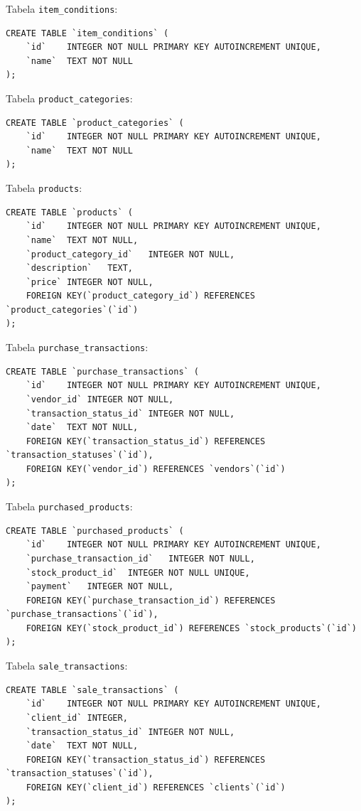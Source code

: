 Tabela \lstinline|item_conditions|:

\begin{lstlisting}[style=SQLite]
CREATE TABLE `item_conditions` (
	`id`	INTEGER NOT NULL PRIMARY KEY AUTOINCREMENT UNIQUE,
	`name`	TEXT NOT NULL
);
\end{lstlisting}

Tabela \lstinline|product_categories|:

\begin{lstlisting}[style=SQLite]
CREATE TABLE `product_categories` (
	`id`	INTEGER NOT NULL PRIMARY KEY AUTOINCREMENT UNIQUE,
	`name`	TEXT NOT NULL
);
\end{lstlisting}

Tabela \lstinline|products|:

\begin{lstlisting}[style=SQLite]
CREATE TABLE `products` (
	`id`	INTEGER NOT NULL PRIMARY KEY AUTOINCREMENT UNIQUE,
	`name`	TEXT NOT NULL,
	`product_category_id`	INTEGER NOT NULL,
	`description`	TEXT,
	`price`	INTEGER NOT NULL,
	FOREIGN KEY(`product_category_id`) REFERENCES `product_categories`(`id`)
);
\end{lstlisting}

Tabela \lstinline|purchase_transactions|:

\begin{lstlisting}[style=SQLite]
CREATE TABLE `purchase_transactions` (
	`id`	INTEGER NOT NULL PRIMARY KEY AUTOINCREMENT UNIQUE,
	`vendor_id`	INTEGER NOT NULL,
	`transaction_status_id`	INTEGER NOT NULL,
	`date`	TEXT NOT NULL,
	FOREIGN KEY(`transaction_status_id`) REFERENCES `transaction_statuses`(`id`),
	FOREIGN KEY(`vendor_id`) REFERENCES `vendors`(`id`)
);
\end{lstlisting}

Tabela \lstinline|purchased_products|:

\begin{lstlisting}[style=SQLite]
CREATE TABLE `purchased_products` (
	`id`	INTEGER NOT NULL PRIMARY KEY AUTOINCREMENT UNIQUE,
	`purchase_transaction_id`	INTEGER NOT NULL,
	`stock_product_id`	INTEGER NOT NULL UNIQUE,
	`payment`	INTEGER NOT NULL,
	FOREIGN KEY(`purchase_transaction_id`) REFERENCES `purchase_transactions`(`id`),
	FOREIGN KEY(`stock_product_id`) REFERENCES `stock_products`(`id`)
);
\end{lstlisting}

Tabela \lstinline|sale_transactions|:

\begin{lstlisting}[style=SQLite]
CREATE TABLE `sale_transactions` (
	`id`	INTEGER NOT NULL PRIMARY KEY AUTOINCREMENT UNIQUE,
	`client_id`	INTEGER,
	`transaction_status_id`	INTEGER NOT NULL,
	`date`	TEXT NOT NULL,
	FOREIGN KEY(`transaction_status_id`) REFERENCES `transaction_statuses`(`id`),
	FOREIGN KEY(`client_id`) REFERENCES `clients`(`id`)
);
\end{lstlisting}

